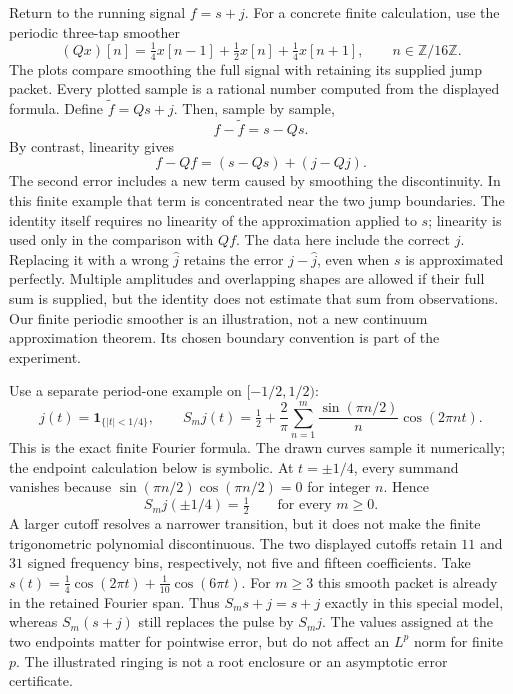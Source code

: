 Return to the running signal $f=s+j$. For a concrete finite calculation, use the periodic three-tap smoother
\[
(Qx)[n]=\tfrac14x[n-1]+\tfrac12x[n]+\tfrac14x[n+1],\qquad n\in\mathbb Z/16\mathbb Z.
\]
The plots compare smoothing the full signal with retaining its supplied jump packet. Every plotted sample is a rational number computed from the displayed formula.
Define $\widetilde f=Qs+j$. Then, sample by sample,
\[
\boxed{f-\widetilde f=s-Qs.}
\]
By contrast, linearity gives
\[
f-Qf=(s-Qs)+(j-Qj).
\]
The second error includes a new term caused by smoothing the discontinuity. In this finite example that term is concentrated near the two jump boundaries. The identity itself requires no linearity of the approximation applied to $s$; linearity is used only in the comparison with $Qf$.
The data here include the correct $j$. Replacing it with a wrong $\widehat j$ retains the error $j-\widehat j$, even when $s$ is approximated perfectly. Multiple amplitudes and overlapping shapes are allowed if their full sum is supplied, but the identity does not estimate that sum from observations.
Our finite periodic smoother is an illustration, not a new continuum approximation theorem. Its chosen boundary convention is part of the experiment.

Use a separate period-one example on $[-1/2,1/2)$:
\[
j(t)=\mathbf 1_{\{|t|<1/4\}},\qquad
S_mj(t)=\tfrac12+\frac2\pi\sum_{n=1}^{m}\frac{\sin(\pi n/2)}{n}\cos(2\pi nt).
\]
This is the exact finite Fourier formula. The drawn curves sample it numerically; the endpoint calculation below is symbolic.
At $t=\pm1/4$, every summand vanishes because
$\sin(\pi n/2)\cos(\pi n/2)=0$ for integer $n$. Hence
\[
S_mj(\pm1/4)=\tfrac12 \qquad\text{for every }m\ge0.
\]
A larger cutoff resolves a narrower transition, but it does not make the finite trigonometric polynomial discontinuous. The two displayed cutoffs retain $11$ and $31$ signed frequency bins, respectively, not five and fifteen coefficients.
Take $s(t)=\frac14\cos(2\pi t)+\frac1{10}\cos(6\pi t)$. For $m\ge3$ this smooth packet is already in the retained Fourier span. Thus $S_ms+j=s+j$ exactly in this special model, whereas $S_m(s+j)$ still replaces the pulse by $S_mj$.
The values assigned at the two endpoints matter for pointwise error, but do not affect an $L^p$ norm for finite $p$. The illustrated ringing is not a root enclosure or an asymptotic error certificate.

